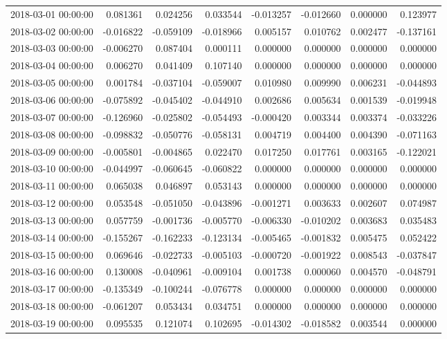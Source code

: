 \begin{tabular}{lrrrrrrr}
2018-03-01 00:00:00 & 0.081361 & 0.024256 & 0.033544 & -0.013257 & -0.012660 & 0.000000 & 0.123977 \\
2018-03-02 00:00:00 & -0.016822 & -0.059109 & -0.018966 & 0.005157 & 0.010762 & 0.002477 & -0.137161 \\
2018-03-03 00:00:00 & -0.006270 & 0.087404 & 0.000111 & 0.000000 & 0.000000 & 0.000000 & 0.000000 \\
2018-03-04 00:00:00 & 0.006270 & 0.041409 & 0.107140 & 0.000000 & 0.000000 & 0.000000 & 0.000000 \\
2018-03-05 00:00:00 & 0.001784 & -0.037104 & -0.059007 & 0.010980 & 0.009990 & 0.006231 & -0.044893 \\
2018-03-06 00:00:00 & -0.075892 & -0.045402 & -0.044910 & 0.002686 & 0.005634 & 0.001539 & -0.019948 \\
2018-03-07 00:00:00 & -0.126960 & -0.025802 & -0.054493 & -0.000420 & 0.003344 & 0.003374 & -0.033226 \\
2018-03-08 00:00:00 & -0.098832 & -0.050776 & -0.058131 & 0.004719 & 0.004400 & 0.004390 & -0.071163 \\
2018-03-09 00:00:00 & -0.005801 & -0.004865 & 0.022470 & 0.017250 & 0.017761 & 0.003165 & -0.122021 \\
2018-03-10 00:00:00 & -0.044997 & -0.060645 & -0.060822 & 0.000000 & 0.000000 & 0.000000 & 0.000000 \\
2018-03-11 00:00:00 & 0.065038 & 0.046897 & 0.053143 & 0.000000 & 0.000000 & 0.000000 & 0.000000 \\
2018-03-12 00:00:00 & 0.053548 & -0.051050 & -0.043896 & -0.001271 & 0.003633 & 0.002607 & 0.074987 \\
2018-03-13 00:00:00 & 0.057759 & -0.001736 & -0.005770 & -0.006330 & -0.010202 & 0.003683 & 0.035483 \\
2018-03-14 00:00:00 & -0.155267 & -0.162233 & -0.123134 & -0.005465 & -0.001832 & 0.005475 & 0.052422 \\
2018-03-15 00:00:00 & 0.069646 & -0.022733 & -0.005103 & -0.000720 & -0.001922 & 0.008543 & -0.037847 \\
2018-03-16 00:00:00 & 0.130008 & -0.040961 & -0.009104 & 0.001738 & 0.000060 & 0.004570 & -0.048791 \\
2018-03-17 00:00:00 & -0.135349 & -0.100244 & -0.076778 & 0.000000 & 0.000000 & 0.000000 & 0.000000 \\
2018-03-18 00:00:00 & -0.061207 & 0.053434 & 0.034751 & 0.000000 & 0.000000 & 0.000000 & 0.000000 \\
2018-03-19 00:00:00 & 0.095535 & 0.121074 & 0.102695 & -0.014302 & -0.018582 & 0.003544 & 0.000000 \\

\end{tabular}
